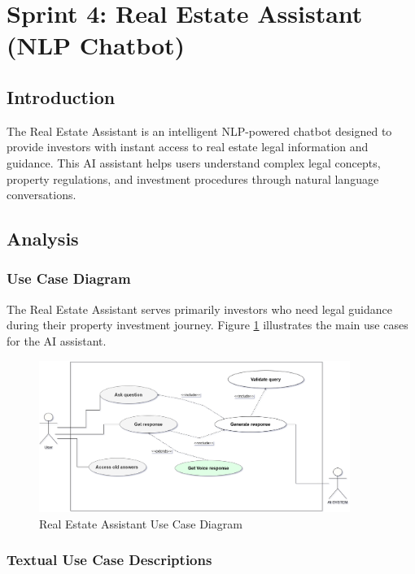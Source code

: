 \newpage

\section{Sprint 4: Real Estate Assistant (NLP Chatbot)}
\subsection*{Introduction}
The Real Estate Assistant is an intelligent NLP-powered chatbot designed to provide investors with instant access to real estate legal information and guidance. This AI assistant helps users understand complex legal concepts, property regulations, and investment procedures through natural language conversations.

\subsection{Analysis}
\subsubsection{Use Case Diagram}
The Real Estate Assistant serves primarily investors who need legal guidance during their property investment journey. Figure \ref{fig:assistant-use-case} illustrates the main use cases for the AI assistant.
\begin{figure}[htbp]
    \centering
    \includegraphics[width=0.9\textwidth]{images/assistant_use_case_diagram.png}
    \caption{Real Estate Assistant Use Case Diagram}
    \label{fig:assistant-use-case}
\end{figure}

\subsubsection{Textual Use Case Descriptions}

